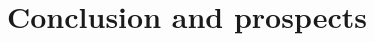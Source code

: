 \begin{comment}
\subsection{Trigger requirements}
\section{Baseline event selection}
\section{Data driven background estimation}
\section{Regions and channels}
\section{Construction of template distributions}
\section{Systematic uncertainties}

\section{Limit setting procedure}
\section{Result and discussion}
\end{comment}
\chapter{Conclusion and prospects}





\begin{appendices}



\addappheadtotoc


\end{appendices}


